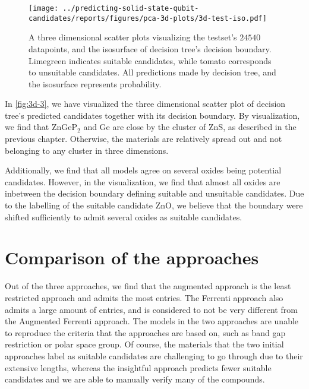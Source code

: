 \begin{figure}[ht!]
    \centering
    \texttt{[image: ../predicting-solid-state-qubit-candidates/reports/figures/pca-3d-plots/3d-test-iso.pdf]}
    \vspace*{-130mm}
    \caption{A three dimensional scatter plots visualizing the testset's $24540$ datapoints, and the isosurface of decision tree's decision boundary. Limegreen indicates suitable candidates, while tomato corresponds to unsuitable candidates. All predictions made by decision tree, and the isosurface represents probability.}
    \label{fig:3d-3}
\end{figure}

In \autoref{fig:3d-3}, we have visualized the three dimensional scatter plot of decision tree's predicted candidates together with its decision boundary. By visualization, we find that ZnGeP$_2$ and Ge are close by the cluster of ZnS, as described in the previous chapter. Otherwise, the materials are relatively spread out and not belonging to any cluster in three dimensions.

Additionally, we find that all models agree on several oxides being potential candidates. However, in the visualization, we find that almost all oxides are inbetween the decision boundary defining suitable and unsuitable candidates. Due to the labelling of the suitable candidate ZnO, we believe that the boundary were shifted sufficiently to admit several oxides as suitable candidates.


\section{Comparison of the approaches}

Out of the three approaches, we find that the augmented approach is the least restricted approach and admits the most entries. The Ferrenti approach also admits a large amount of entries, and is considered to not be very different from the Augmented Ferrenti approach. The models in the two approaches are unable to reproduce the criteria that the approaches are based on, such as band gap restriction or polar space group. Of course, the materials that the two initial approaches label as suitable candidates are challenging to go through due to their extensive lengths, whereas the insightful approach predicts fewer suitable candidates and we are able to manually verify many of the compounds.

